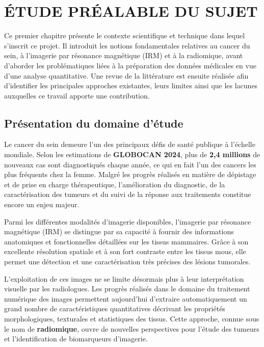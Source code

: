 \documentclass[12pt,a4paper]{report}
\begin{document}
    \chapter{ÉTUDE PRÉALABLE DU SUJET}
    
    Ce premier chapitre présente le contexte scientifique et technique dans lequel s'inscrit ce projet. Il introduit les notions fondamentales relatives au cancer du sein, à l'imagerie par résonance magnétique (IRM) et à la radiomique, avant d'aborder les problématiques liées à la préparation des données médicales en vue d'une analyse quantitative. Une revue de la littérature est ensuite réalisée afin d'identifier les principales approches existantes, leurs limites ainsi que les lacunes auxquelles ce travail apporte une contribution.
    
    \section{Présentation du domaine d'étude}
    
    Le cancer du sein demeure l'un des principaux défis de santé publique à l'échelle mondiale. Selon les estimations de \textbf{GLOBOCAN 2024}, plus de \textbf{2,4 millions} de nouveaux cas sont diagnostiqués chaque année, ce qui en fait l'un des cancers les plus fréquents chez la femme. Malgré les progrès réalisés en matière de dépistage et de prise en charge thérapeutique, l'amélioration du diagnostic, de la caractérisation des tumeurs et du suivi de la réponse aux traitements constitue encore un enjeu majeur.
    
    Parmi les différentes modalités d'imagerie disponibles, l'imagerie par résonance magnétique (IRM) se distingue par sa capacité à fournir des informations anatomiques et fonctionnelles détaillées sur les tissus mammaires. Grâce à son excellente résolution spatiale et à son fort contraste entre les tissus mous, elle permet une détection et une caractérisation très précises des lésions tumorales.
    
    L'exploitation de ces images ne se limite désormais plus à leur interprétation visuelle par les radiologues. Les progrès réalisés dans le domaine du traitement numérique des images permettent aujourd'hui d'extraire automatiquement un grand nombre de caractéristiques quantitatives décrivant les propriétés morphologiques, texturales et statistiques des tissus. Cette approche, connue sous le nom de \textbf{radiomique}, ouvre de nouvelles perspectives pour l'étude des tumeurs et l'identification de biomarqueurs d'imagerie.
    
\end{document}

